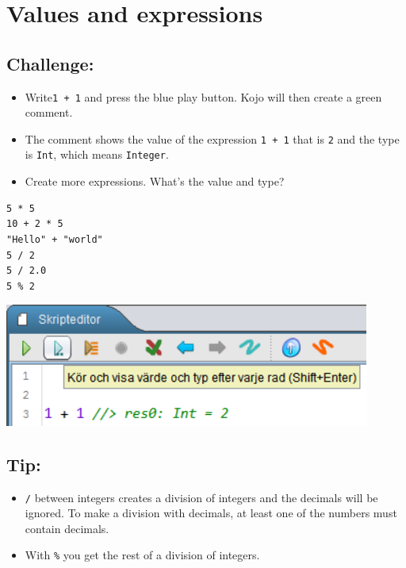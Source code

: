 \chapter{Values and expressions}
\begin{multicols}{2}
\section*{\color{BrickRed}Challenge:}


\begin{itemize}

\item {Write\lstinline{1 + 1} and press the blue play button. Kojo will then create a green comment.}
\item {The comment shows the value of the expression \lstinline{1 + 1} that is \lstinline{2} and the type is \lstinline{Int}, which means \lstinline{Integer}.}
\item {Create more expressions. What's the value and type?}

\end{itemize}



\begin{lstlisting}[numbers=none]
5 * 5
10 + 2 * 5
"Hello" + "world"
5 / 2
5 / 2.0
5 % 2
\end{lstlisting}
        


\columnbreak


\includegraphics[width=12.0cm]{../img/show-value.png}
\section*{\color{OliveGreen}Tip:}


\begin{itemize}

\item {\lstinline{/} between integers creates a division of integers and the decimals will be ignored. To make a division with decimals, at least one of the numbers must contain decimals.}
\item {With \lstinline{%} you get the rest of a division of integers.}

\end{itemize}


\end{multicols}


